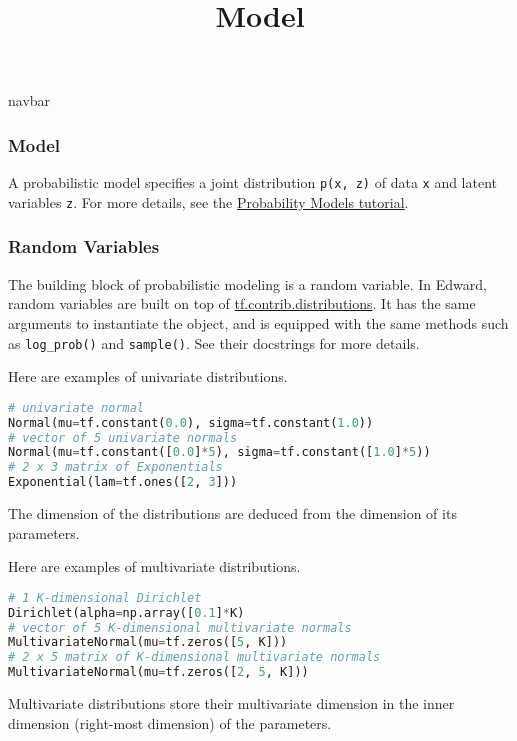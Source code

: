 \title{Model}

{{navbar}}

\subsubsection{Model}

A probabilistic model specifies a joint distribution \texttt{p(x, z)}
of data \texttt{x} and latent variables \texttt{z}.
For more details, see the
\href{/tutorials/model}
{Probability Models tutorial}.

\subsubsection{Random Variables}

The building block of probabilistic modeling is a random variable. In
Edward, random variables are built on top of
\href{https://github.com/tensorflow/tensorflow/tree/master/tensorflow/contrib/distributions}
{tf.contrib.distributions}.
It has the same arguments to instantiate the object, and is equipped
with the same methods such as \texttt{log_prob()} and \texttt{sample()}.
See their docstrings for more details.

Here are examples of univariate distributions.

\begin{lstlisting}[language=Python]
# univariate normal
Normal(mu=tf.constant(0.0), sigma=tf.constant(1.0))
# vector of 5 univariate normals
Normal(mu=tf.constant([0.0]*5), sigma=tf.constant([1.0]*5))
# 2 x 3 matrix of Exponentials
Exponential(lam=tf.ones([2, 3]))
\end{lstlisting}

The dimension of the distributions are deduced from the dimension of
its parameters.

Here are examples of multivariate distributions.

\begin{lstlisting}[language=Python]
# 1 K-dimensional Dirichlet
Dirichlet(alpha=np.array([0.1]*K)
# vector of 5 K-dimensional multivariate normals
MultivariateNormal(mu=tf.zeros([5, K]))
# 2 x 5 matrix of K-dimensional multivariate normals
MultivariateNormal(mu=tf.zeros([2, 5, K]))
\end{lstlisting}

Multivariate distributions store their multivariate dimension in the
inner dimension (right-most dimension) of the parameters.

